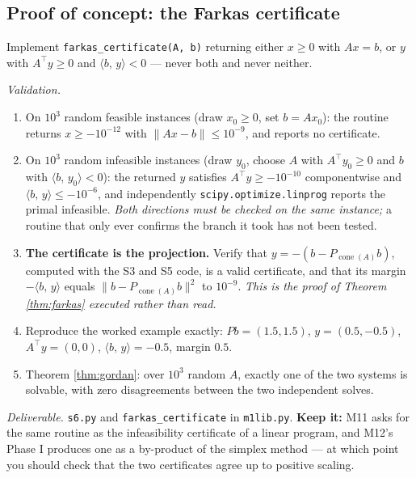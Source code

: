 \documentclass[11pt,a4paper]{article}
\theoremstyle{definition}
\theoremstyle{plain}
\theoremstyle{remark}
\newcommand{\ip}[2]{\langle #1,\, #2\rangle}
\newcommand{\norm}[1]{\lVert #1\rVert}
\newcommand{\proj}{P}
\DeclareMathOperator{\cone}{cone}
\begin{document}
\subsection*{Proof of concept: the Farkas certificate}

Implement \texttt{farkas\_certificate(A, b)} returning either $x\ge0$ with $Ax=b$, or $y$ with
$A^\top y\ge0$ and $\ip{b}{y}<0$ --- never both and never neither.

\emph{Validation.}
\begin{enumerate}
\item On $10^3$ random feasible instances (draw $x_0\ge0$, set $b=Ax_0$): the routine returns
$x\ge-10^{-12}$ with $\norm{Ax-b}\le10^{-9}$, and reports no certificate.
\item On $10^3$ random infeasible instances (draw $y_0$, choose $A$ with $A^\top y_0\ge0$ and
$b$ with $\ip{b}{y_0}<0$): the returned $y$ satisfies $A^\top y\ge-10^{-10}$ componentwise and
$\ip{b}{y}\le-10^{-6}$, and independently \texttt{scipy.optimize.linprog} reports the primal
infeasible. \emph{Both directions must be checked on the same instance;} a routine that only
ever confirms the branch it took has not been tested.
\item \textbf{The certificate is the projection.} Verify that
$y=-(b-\proj_{\cone(A)}b)$, computed with the S3 and S5 code, is a valid certificate, and that
its margin $-\ip{b}{y}$ equals $\norm{b-\proj_{\cone(A)}b}^2$ to $10^{-9}$. \emph{This is the
proof of Theorem \ref{thm:farkas} executed rather than read.}
\item Reproduce the worked example exactly: $\proj b=(1.5,1.5)$, $y=(0.5,-0.5)$,
$A^\top y=(0,0)$, $\ip{b}{y}=-0.5$, margin $0.5$.
\item Theorem \ref{thm:gordan}: over $10^3$ random $A$, exactly one of the two systems is
solvable, with zero disagreements between the two independent solves.
\end{enumerate}

\emph{Deliverable.} \texttt{s6.py} and \texttt{farkas\_certificate} in \texttt{m1lib.py}.
\textbf{Keep it:} M11 asks for the same routine as the infeasibility certificate of a linear
program, and M12's Phase I produces one as a by-product of the simplex method --- at which point
you should check that the two certificates agree up to positive scaling.
\end{document}
